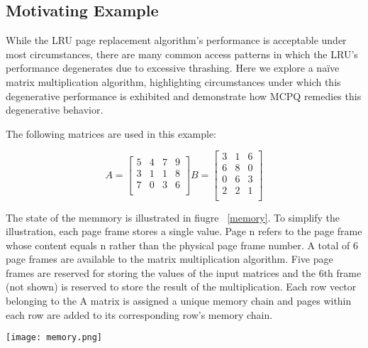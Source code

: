 \documentclass[10pt,a4paper,twocolumn]{article}
\begin{document}
\subsection{Motivating Example}
\label{example}
While the LRU page replacement algorithm's performance is acceptable
under most circumstances, there are many common access patterns in which the LRU's performance
degenerates due to excessive thrashing. Here we explore a naïve matrix multiplication algorithm,
highlighting circumstances under which this degenerative performance is exhibited and demonstrate
how MCPQ remedies this degenerative behavior. 

The following matrices are used in this example:

\[ A = 
\left[ {\begin{array}{cccc}
5 & 4 & 7 & 9  \\ 
3 & 1 & 1 & 8  \\ 
7 & 0 & 3 & 6  \\ 
\end{array}
} \right]
 B = 
\left[ {\begin{array}{ccc}
 3 & 1 & 6   \\
 6 & 8 & 0   \\
 0 & 6 & 3   \\
 2 & 2 & 1   \\
 \end{array} } \right]
\]

The state of the memmory is illustrated in fiugre ~\ref{memory}. To simplify the illustration, each
page frame stores a single value. Page n refers to the page frame whose content equals n rather than
the physical page frame number. A total of 6 page frames are available to the matrix multiplication
algorithm. Five page frames are reserved for storing the values of the input matrices and the 6th
frame (not shown) is reserved to store the result of the multiplication. Each row vector belonging
to the A matrix is assigned a unique memory chain and pages within each row are added to its
corresponding row's memory chain.

\begin{figure*}[htbp]
\centering
\texttt{[image: memory.png]}
\caption{\emph{\small State of Memory. Each table shows the state of the memory for subsequent iterations of the algorithm. The contents of a page frame include: [the page's contents, the unique timestamp, and the effective-timestamp].  Timestamps are modulo 16.}}
\label{memory}
\end{figure*}
\end{document}
